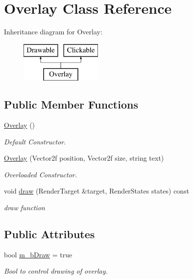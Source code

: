 \hypertarget{class_overlay}{}\section{Overlay Class Reference}
\label{class_overlay}
Inheritance diagram for Overlay\+:\begin{figure}[H]
\begin{center}
\leavevmode
\includegraphics[height=2.000000cm]{class_overlay}
\end{center}
\end{figure}
\subsection*{Public Member Functions}
\begin{DoxyCompactItemize}
\item 
\hyperlink{class_overlay_ab4f509d502931bcaad03418470993d70}{Overlay} ()
\begin{DoxyCompactList}\small\item\em Default Constructor. \end{DoxyCompactList}\item 
\hyperlink{class_overlay_a6cd84b6dc4fdcb2a6fbfafaf5e63e170}{Overlay} (Vector2f position, Vector2f size, string text)
\begin{DoxyCompactList}\small\item\em Overloaded Constructor. \end{DoxyCompactList}\item 
void \hyperlink{class_overlay_abe32d7e0e71733150f7a28cf3e851aa1}{draw} (Render\+Target \&target, Render\+States states) const
\begin{DoxyCompactList}\small\item\em draw function \end{DoxyCompactList}\end{DoxyCompactItemize}
\subsection*{Public Attributes}
\begin{DoxyCompactItemize}
\item 
\hypertarget{class_overlay_a9a70a96aa1bc41ee3e0c34dfb705f7b9}{}\label{class_overlay_a9a70a96aa1bc41ee3e0c34dfb705f7b9} 
bool \hyperlink{class_overlay_a9a70a96aa1bc41ee3e0c34dfb705f7b9}{m\+\_\+b\+Draw} = true
\begin{DoxyCompactList}\small\item\em Bool to control drawing of overlay. \end{DoxyCompactList}\end{DoxyCompactItemize}
